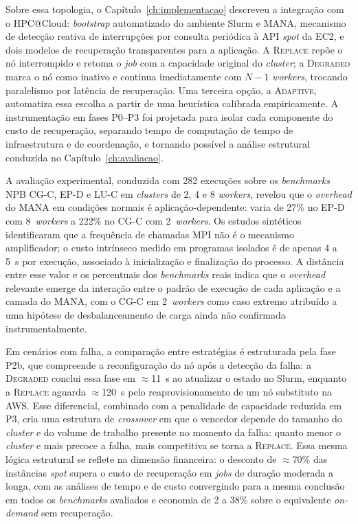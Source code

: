 Sobre essa topologia, o Capítulo~\ref{ch:implementacao} descreveu a integração com
o HPC@Cloud: \textit{bootstrap} automatizado do ambiente Slurm e MANA,
mecanismo de detecção reativa de interrupções por consulta periódica à API \textit{spot}
da EC2, e dois modelos de recuperação transparentes para a aplicação. A
\textsc{Replace} repõe o nó interrompido e retoma o \textit{job} com a capacidade
original do \textit{cluster}; a \textsc{Degraded} marca o nó como inativo e continua
imediatamente com $N{-}1$ \textit{workers}, trocando paralelismo por latência de
recuperação. Uma terceira opção, a \textsc{Adaptive}, automatiza essa escolha a
partir de uma heurística calibrada empiricamente. A instrumentação em fases P0--P3
foi projetada para isolar cada componente
do custo de recuperação, separando tempo de computação de tempo de infraestrutura e de
coordenação, e tornando possível a análise estrutural conduzida no
Capítulo~\ref{ch:avaliacao}.

A avaliação experimental, conduzida com 282 execuções sobre os \textit{benchmarks} NPB
CG-C, EP-D e LU-C em \textit{clusters} de 2, 4 e 8 \textit{workers}, revelou que o
\textit{overhead} do MANA em condições normais é aplicação-dependente: varia de 27\%
no EP-D com 8~\textit{workers} a 222\% no CG-C com 2~\textit{workers}. Os estudos
sintéticos identificaram que a frequência de chamadas MPI não é o mecanismo
amplificador; o custo intrínseco medido em programas isolados é de apenas 4 a 5~s por
execução, associado à inicialização e finalização do processo. A distância entre esse
valor e os percentuais dos \textit{benchmarks} reais indica que o \textit{overhead}
relevante emerge da interação entre o padrão de execução de cada aplicação e a camada
do MANA, com o CG-C em 2~\textit{workers} como caso extremo atribuído a uma hipótese
de desbalanceamento de carga ainda não confirmada instrumentalmente.

Em cenários com falha, a comparação entre estratégias é estruturada pela fase P2b, que
compreende a reconfiguração do nó após a detecção da falha: a \textsc{Degraded} conclui
essa fase em $\approx$11~s ao atualizar o estado no Slurm, enquanto a \textsc{Replace}
aguarda $\approx$120~s pelo reaprovisionamento de um nó substituto na AWS. Esse
diferencial, combinado com a penalidade de capacidade reduzida em P3, cria uma estrutura
de \textit{crossover} em que o vencedor depende do tamanho do \textit{cluster} e do
volume de trabalho presente no momento da falha: quanto menor o \textit{cluster} e mais
precoce a falha, mais competitiva se torna a \textsc{Replace}. Essa mesma lógica
estrutural se reflete na dimensão financeira: o desconto de $\approx$70\% das instâncias
\textit{spot} supera o custo de recuperação em \textit{jobs} de duração moderada a
longa, com as análises de tempo e de custo convergindo para a mesma conclusão em todos
os \textit{benchmarks} avaliados e economia de 2 a 38\% sobre o equivalente
\textit{on-demand} sem recuperação.

